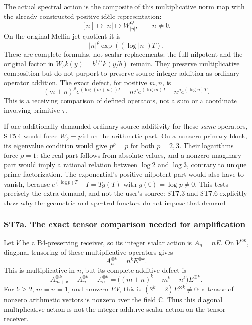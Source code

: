The actual spectral action is the composite of this multiplicative norm
map with the already constructed positive idèle representation: \[
 [n]\longmapsto |n|\longmapsto W_{|n|}^Q,\qquad n\ne0.
\tag{ST7.6}
\] On the original Mellin-jet quotient it is \[
 |n|^\rho\exp((\log|n|)T).
\tag{ST7.7}
\] These are complete formulas, not scalar replacements: the full
nilpotent and the original factor in \(W_bk(y)=b^{1/2}k(y/b)\) remain.
They preserve multiplicative composition but do not purport to preserve
source integer addition as ordinary operator addition. The exact defect,
for positive \(m,n\), is \[
 (m+n)^\rho e^{(\log(m+n))T}
 -m^\rho e^{(\log m)T}
 -n^\rho e^{(\log n)T}.
\tag{ST7.8}
\] This is a receiving comparison of defined operators, not a sum or a
coordinate involving primitive \(\tau\).

If one additionally demanded ordinary source additivity for these
\emph{same} operators, ST5.4 would force \(W_p=p\,\mathrm{id}\) on the
arithmetic part. On a nonzero primary block, its eigenvalue condition
would give \(p^\rho=p\) for both \(p=2,3\). Their logarithms force
\(\rho=1\): the real part follows from absolute values, and a nonzero
imaginary part would imply a rational relation between \(\log2\) and
\(\log3\), contrary to unique prime factorization. The exponential's
positive nilpotent part would also have to vanish, because
\(e^{(\log p)T}-I=Tg(T)\) with \(g(0)=\log p\ne0\). This tests precisely
the extra demand, and not the user's source: ST7.3 and ST7.6 explicitly
show why the geometric and spectral functors do not impose that demand.

\subsubsection{ST7a. The exact tensor comparison needed for
amplification}\label{st7a.-the-exact-tensor-comparison-needed-for-amplification}

Let \(V\) be a B4-preserving receiver, so its integer scalar action is
\(A_n=nE\). On \(V^{\otimes k}\), diagonal tensoring of these
multiplicative operators gives \[
 A_n^{\otimes k}=n^k E^{\otimes k}.
\tag{ST7a.1}
\] This is multiplicative in \(n\), but its complete additive defect is
\[
 A_{m+n}^{\otimes k}-A_m^{\otimes k}-A_n^{\otimes k}
 =\bigl((m+n)^k-m^k-n^k\bigr)E^{\otimes k}.
\tag{ST7a.2}
\] For \(k\ge2\), \(m=n=1\), and nonzero \(EV\), this is
\((2^k-2)E^{\otimes k}\ne0\): a tensor of nonzero arithmetic vectors is
nonzero over the field \(\mathbb C\). Thus this diagonal multiplicative
action is not the integer-additive scalar action on the tensor receiver.

